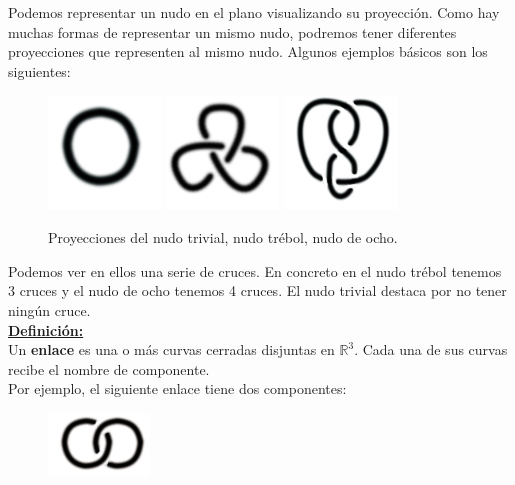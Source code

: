 \documentclass[14pt]{extarticle}
\begin{document}
Podemos representar un nudo en el plano visualizando su proyección. Como hay muchas formas de representar un mismo nudo, podremos tener diferentes proyecciones que representen al mismo nudo. 
 Algunos ejemplos básicos son los siguientes:\\
  \begin{figure}[h!]
  	\includegraphics[width=3cm]{inudos/1.jpg}
  	\includegraphics[width=3cm]{inudos/3f.png} 
  	\includegraphics[width=3cm]{inudos/fig8.jpg}
  	\centering
  	\caption{Proyecciones del nudo trivial, nudo trébol, nudo de ocho.}
  	\label{uno} 
  \end{figure}
  
  Podemos ver en ellos una serie de cruces. En concreto en el nudo trébol tenemos 3 cruces y el nudo de ocho tenemos 4 cruces. El nudo trivial destaca por no tener ningún cruce. \\
  
    \underline{\textbf{Definición:}}\\
     Un \textbf{enlace} es una o más curvas cerradas disjuntas en $\mathds{R}^{3}$. Cada una de sus curvas recibe el nombre de componente.\\
     Por ejemplo, el siguiente enlace tiene dos componentes:
  \begin{figure}[h!]
  	\includegraphics[width=2.7cm]{inudos/enlace.png}
  	\centering
  	\label{dos} 
  \end{figure}
\end{document}

